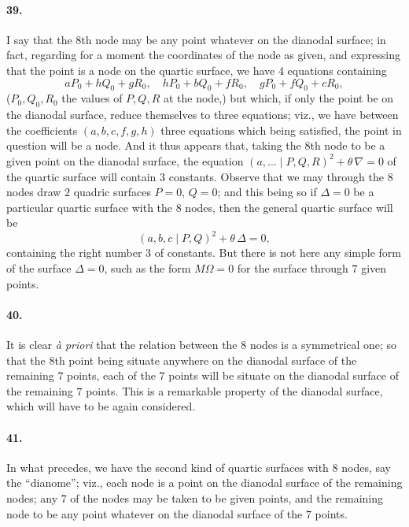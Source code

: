 \documentclass[11pt,a4paper]{article}
\begin{document}
\paragraph{39.}
I say that the $8$th node may be any point whatever on the dianodal surface; in fact,
regarding for a moment the coordinates of the node as given, and expressing that the point
is a node on the quartic surface, we have $4$ equations containing
\[
a P_0 + h Q_0 + g R_0,\quad h P_0 + b Q_0 + f R_0,\quad g P_0 + f Q_0 + c R_0,
\]
($P_0, Q_0, R_0$ the values of $P, Q, R$ at the node,) but which, if only the point be on
the dianodal surface, reduce themselves to three equations; viz., we have between the
coefficients $(a, b, c, f, g, h)$ three equations which being satisfied, the point in
question will be a node. And it thus appears that, taking the $8$th node to be a given
point on the dianodal surface, the equation $(a, \ldots  \mid P, Q, R)^2 + \theta\,\nabla = 0$
of the quartic surface will contain $3$ constants. Observe that we may through the $8$
nodes draw $2$ quadric surfaces $P = 0$, $Q = 0$; and this being so if $\Delta = 0$ be a
particular quartic surface with the $8$ nodes, then the general quartic surface will be
\[
(a, b, c  \mid P, Q)^2 + \theta\,\Delta = 0,
\]
containing the right number $3$ of constants. But there is not here any simple form of the
surface $\Delta = 0$, such as the form $M \Omega = 0$ for the surface through $7$ given
points.

\paragraph{40.}
It is clear \textit{\`a priori} that the relation between the $8$ nodes is a symmetrical
one; so that the $8$th point being situate anywhere on the dianodal surface of the
remaining $7$ points, each of the $7$ points will be situate on the dianodal surface of the
remaining $7$ points. This is a remarkable property of the dianodal surface, which will
have to be again considered.

\paragraph{41.}
In what precedes, we have the second kind of quartic surfaces with $8$ nodes, say the
``dianome''; viz., each node is a point on the dianodal surface of the remaining nodes; any
$7$ of the nodes may be taken to be given points, and the remaining node to be any point
whatever on the dianodal surface of the $7$ points.
\end{document}
